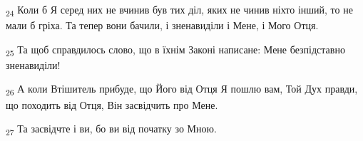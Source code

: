 \begin{tcolorbox}
\textsubscript{24} Коли б Я серед них не вчинив був тих діл, яких не чинив ніхто інший, то не мали б гріха. Та тепер вони бачили, і зненавиділи і Мене, і Мого Отця.
\end{tcolorbox}
\begin{tcolorbox}
\textsubscript{25} Та щоб справдилось слово, що в їхнім Законі написане: Мене безпідставно зненавиділи!
\end{tcolorbox}
\begin{tcolorbox}
\textsubscript{26} А коли Втішитель прибуде, що Його від Отця Я пошлю вам, Той Дух правди, що походить від Отця, Він засвідчить про Мене.
\end{tcolorbox}
\begin{tcolorbox}
\textsubscript{27} Та засвідчте і ви, бо ви від початку зо Мною.
\end{tcolorbox}
